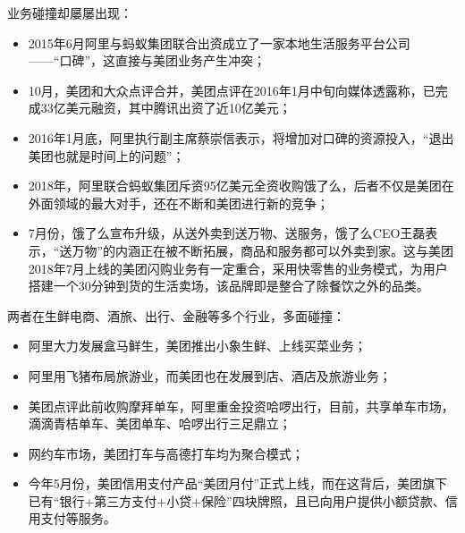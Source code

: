 \documentclass[letterpaper,10pt,english]{sphinxmanual}
\begin{document}
业务碰撞却屡屡出现：
\begin{itemize}
\item {} 
2015年6月阿里与蚂蚁集团联合出资成立了一家本地生活服务平台公司
——“口碑”，这直接与美团业务产生冲突；

\item {} 
10月，美团和大众点评合并，美团点评在2016年1月中旬向媒体透露称，已完成33亿美元融资，其中腾讯出资了近10亿美元；

\item {} 
2016年1月底，阿里执行副主席蔡崇信表示，将增加对口碑的资源投入，“退出美团也就是时间上的问题”；

\item {} 
2018年，阿里联合蚂蚁集团斥资95亿美元全资收购饿了么，后者不仅是美团在外面领域的最大对手，还在不断和美团进行新的竞争；

\item {} 
7月份，饿了么宣布升级，从送外卖到送万物、送服务，饿了么CEO王磊表示，“送万物”的内涵正在被不断拓展，商品和服务都可以外卖到家。这与美团2018年7月上线的美团闪购业务有一定重合，采用快零售的业务模式，为用户搭建一个30分钟到货的生活卖场，该品牌即是整合了除餐饮之外的品类。

\end{itemize}

两者在生鲜电商、酒旅、出行、金融等多个行业，多面碰撞：%
\begin{footnote}[1029]\sphinxAtStartFootnote
{}
%
\end{footnote}
\begin{itemize}
\item {} 
阿里大力发展盒马鲜生，美团推出小象生鲜、上线买菜业务；

\item {} 
阿里用飞猪布局旅游业，而美团也在发展到店、酒店及旅游业务；

\item {} 
美团点评此前收购摩拜单车，阿里重金投资哈啰出行，目前，共享单车市场，滴滴青桔单车、美团单车、哈啰出行三足鼎立；

\item {} 
网约车市场，美团打车与高德打车均为聚合模式；

\item {} 
今年5月份，美团信用支付产品“美团月付”正式上线，而在这背后，美团旗下已有“银行+第三方支付+小贷+保险”四块牌照，且已向用户提供小额贷款、信用支付等服务。

\end{itemize}
\end{document}
